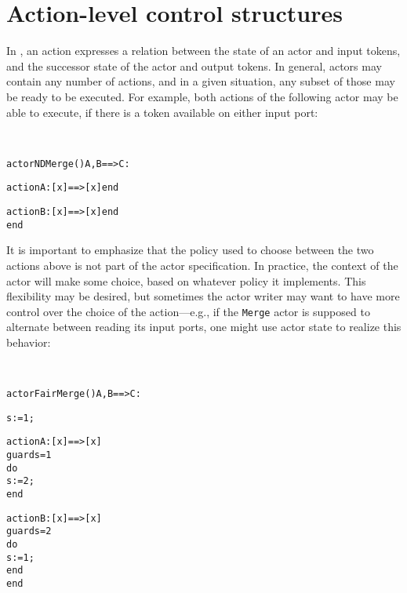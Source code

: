 
\chapter{Action-level control structures}\label{chap:ActionControl}



In \Cal, an action expresses a relation between the state of an actor
and input tokens, and the successor state of the actor and output
tokens. In general, \Cal actors may contain any number of actions, and
in a given situation, any subset of those may be ready to be executed.
For example, both actions of the following actor may be able to
execute, if there is a token available on either input port:

\begin{example}\  
\begin{alltt}actor NDMerge () A, B ==> C :

  action A: [x] ==> [x] end

  action B: [x] ==> [x] end
end
\end{alltt}
\end{example}

It is important to emphasize that the policy used to choose between
the two actions above is not part of the actor specification. In
practice, the context of the actor will make some choice, based on
whatever policy it implements. This flexibility may be desired, but
sometimes the  actor writer
may want to have more control over the choice of the action---e.g., if
the {\tt Merge} actor is supposed to alternate between reading its
input ports, one might use actor state to realize this behavior:

\begin{example}\  
\begin{alltt}actor FairMerge () A, B ==> C :

  s := 1;

  action A: [x] ==> [x]
  guard s = 1
  do
    s := 2; 
  end

  action B: [x] ==> [x]
  guard s = 2
  do
    s := 1;
  end
end
\end{alltt}
\end{example}

